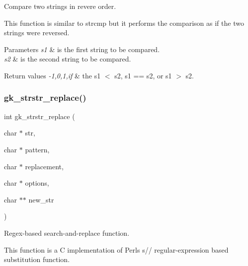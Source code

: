 Compare two strings in revere order. 

This function is similar to strcmp but it performs the comparison as if the two strings were reversed.


\begin{DoxyParams}{Parameters}
{\em s1} & is the first string to be compared. \\
\hline
{\em s2} & is the second string to be compared. \\
\hline
\end{DoxyParams}

\begin{DoxyRetVals}{Return values}
{\em -\/1,0,1,if} & the s1 $<$ s2, s1 == s2, or s1 $>$ s2. \\
\hline
\end{DoxyRetVals}
\mbox{\label{a00143_a46e5cf8f76a1ece74adf1b8b9dfcb275}} 
\subsubsection{\texorpdfstring{gk\+\_\+strstr\+\_\+replace()}{gk\_strstr\_replace()}}
{\footnotesize\ttfamily int gk\+\_\+strstr\+\_\+replace (\begin{DoxyParamCaption}\item[{char $\ast$}]{str,  }\item[{char $\ast$}]{pattern,  }\item[{char $\ast$}]{replacement,  }\item[{char $\ast$}]{options,  }\item[{char $\ast$$\ast$}]{new\+\_\+str }\end{DoxyParamCaption})}



Regex-\/based search-\/and-\/replace function. 

This function is a C implementation of Perl\textquotesingle{}s {\ttfamily  s//} regular-\/expression based substitution function.


